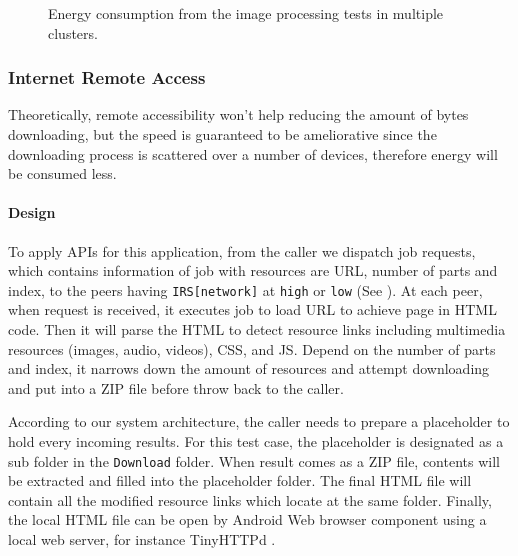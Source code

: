 \documentclass[conference]{IEEEtran}
\begin{document}
\begin{figure}[H]
	\hspace*{0.25cm}
	\caption{Energy consumption from the image processing tests in multiple clusters.}
	\label{fig:small_img_energy}
\end{figure}


\subsubsection{Internet Remote Access} 
Theoretically, remote accessibility won't help reducing the amount of bytes downloading, but the speed is guaranteed to be ameliorative since the downloading process is scattered over a number of devices, therefore energy will be consumed less. 

\paragraph{Design}

To apply APIs for this application, from the caller we dispatch job requests, which contains information of job with resources are URL, number of parts and index, to the peers having \texttt{IRS[network]} at \texttt{high} or \texttt{low} (See ). At each peer, when request is received, it executes job to load URL to achieve page in HTML code. Then it will parse the HTML to detect resource links including multimedia resources (images, audio, videos), CSS, and JS. Depend on the number of parts and index, it narrows down the amount of resources and attempt downloading and put into a ZIP file before throw back to the caller.

According to our system architecture, the caller needs to prepare a placeholder to hold every incoming results. For this test case, the placeholder is designated as a sub folder in the \texttt{Download} folder. When result comes as a ZIP file, contents will be extracted and filled into the placeholder folder. The final HTML file will contain all the modified resource links which locate at the same folder. Finally, the local HTML file can be open by Android Web browser component using a local web server, for instance TinyHTTPd \cite{tinyhttpd}.
\end{document}
